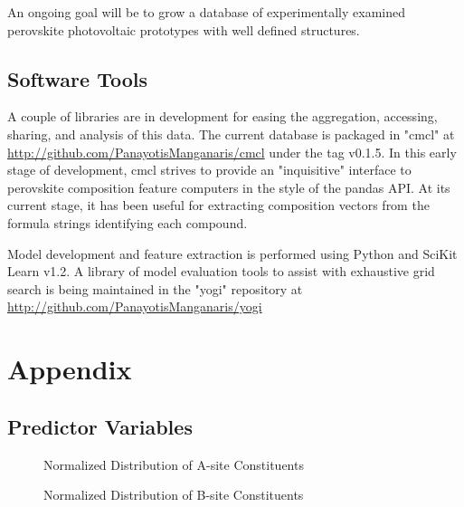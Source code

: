 \documentclass[aip, jmp, amsmath, amssymb, nofootinbib]{revtex4-2}
\begin{document}
An ongoing goal will be to grow a database of experimentally examined
perovskite photovoltaic prototypes with well defined structures.

\subsection*{Software Tools}
\label{sec:orgdd61880}
A couple of libraries are in development for easing the aggregation,
accessing, sharing, and analysis of this data. The current database is
packaged in "cmcl" at \url{http://github.com/PanayotisManganaris/cmcl} under
the tag v0.1.5. In this early stage of development, cmcl strives to
provide an "inquisitive" interface to perovskite composition feature
computers in the style of the pandas API. At its current stage, it has
been useful for extracting composition vectors from the formula
strings identifying each compound.

Model development and feature extraction is performed using Python and
SciKit Learn v1.2. A library of model evaluation tools to assist with
exhaustive grid search is being maintained in the "yogi" repository at
\url{http://github.com/PanayotisManganaris/yogi}

\section*{}
\label{sec:org716f68f}
\pagebreak


\printglossaries

\section*{Appendix}
\label{sec:orgc8a5336}
\subsection*{Predictor Variables}
\label{sec:orgb09a235}
 
\begin{figure}[htbp]
\centering

\caption{Normalized Distribution of A-site Constituents}
\end{figure}

 
\begin{figure}[htbp]
\centering

\caption{Normalized Distribution of B-site Constituents}
\end{figure}
\end{document}
